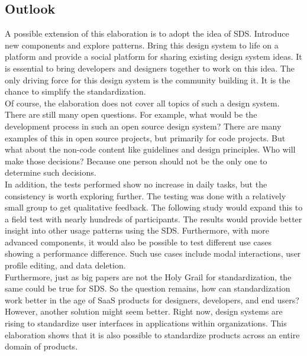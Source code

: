 \subsection{Outlook}
A possible extension of this elaboration is to adopt the idea of \ac{SDS}. Introduce new components and explore patterns. Bring this design system to life on a platform and provide a social platform for sharing existing design system ideas. It is essential to bring developers and designers together to work on this idea. The only driving force for this design system is the community building it. It is the chance to simplify the standardization. \\
Of course, the elaboration does not cover all topics of such a design system. There are still many open questions. For example, what would be the development process in such an open source design system? There are many examples of this in open source projects, but primarily for code projects. But what about the non-code content like guidelines and design principles. Who will make those decisions? Because one person should not be the only one to determine such decisions. \\
In addition, the tests performed show no increase in daily tasks, but the consistency is worth exploring further. The testing was done with a relatively small group to get qualitative feedback. The following study would expand this to a field test with nearly hundreds of participants. The results would provide better insight into other usage patterns using the \ac{SDS}. Furthermore, with more advanced components, it would also be possible to test different use cases showing a performance difference. Such use cases include modal interactions, user profile editing, and data deletion. \\
Furthermore, just as big papers are not the Holy Grail for standardization, the same could be true for \ac{SDS}. So the question remains, how can standardization work better in the age of \ac{SaaS} products for designers, developers, and end users? However, another solution might seem better. Right now, design systems are rising to standardize user interfaces in applications within organizations. This elaboration shows that it is also possible to standardize products across an entire domain of products. 